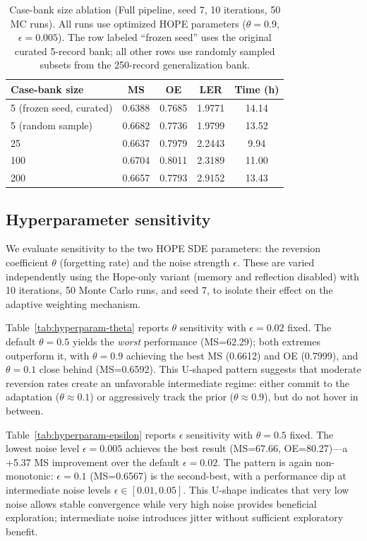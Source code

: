 \begin{table}[ht]
\centering
\caption{Case-bank size ablation (Full pipeline, seed 7, 10 iterations, 50 MC runs). All runs use optimized HOPE parameters ($\theta=0.9$, $\epsilon=0.005$). The row labeled ``frozen seed'' uses the original curated 5-record bank; all other rows use randomly sampled subsets from the 250-record generalization bank.}
\label{tab:casebank-ablation}
\small
\setlength{\tabcolsep}{5pt}
\begin{tabular}{lcccc}
\toprule
Case-bank size & MS & OE & LER & Time (h) \\
\midrule
5 (frozen seed, curated) & 0.6388 & 0.7685 & 1.9771 & 14.14 \\
5 (random sample) & 0.6682 & 0.7736 & 1.9799 & 13.52 \\
25 & 0.6637 & 0.7979 & 2.2443 & 9.94 \\
100 & 0.6704 & 0.8011 & 2.3189 & 11.00 \\
200 & 0.6657 & 0.7793 & 2.9152 & 13.43 \\
\bottomrule
\end{tabular}
\end{table}

\subsection{Hyperparameter sensitivity}

We evaluate sensitivity to the two HOPE SDE parameters: the reversion coefficient $\theta$ (forgetting rate) and the noise strength $\epsilon$. These are varied independently using the Hope-only variant (memory and reflection disabled) with 10 iterations, 50 Monte Carlo runs, and seed 7, to isolate their effect on the adaptive weighting mechanism.

Table~\ref{tab:hyperparam-theta} reports $\theta$ sensitivity with $\epsilon=0.02$ fixed. The default $\theta=0.5$ yields the \emph{worst} performance (MS=62.29); both extremes outperform it, with $\theta=0.9$ achieving the best MS (0.6612) and OE (0.7999), and $\theta=0.1$ close behind (MS=0.6592). This U-shaped pattern suggests that moderate reversion rates create an unfavorable intermediate regime: either commit to the adaptation ($\theta\approx0.1$) or aggressively track the prior ($\theta\approx0.9$), but do not hover in between.

Table~\ref{tab:hyperparam-epsilon} reports $\epsilon$ sensitivity with $\theta=0.5$ fixed. The lowest noise level $\epsilon=0.005$ achieves the best result (MS=67.66, OE=80.27)---a +5.37 MS improvement over the default $\epsilon=0.02$. The pattern is again non-monotonic: $\epsilon=0.1$ (MS=0.6567) is the second-best, with a performance dip at intermediate noise levels $\epsilon\in[0.01,0.05]$. This U-shape indicates that very low noise allows stable convergence while very high noise provides beneficial exploration; intermediate noise introduces jitter without sufficient exploratory benefit.

